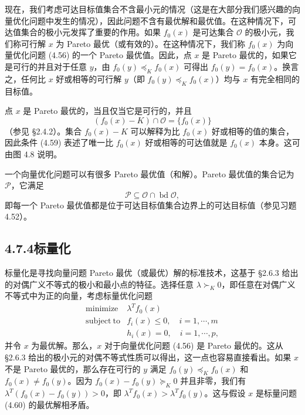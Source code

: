 \documentclass[UTF8, 12pt, fontset=fandol, oneside]{ctexart}
\begin{document}
现在，我们考虑可达目标值集合不含最小元的情况（这是在大部分我们感兴趣的向量优化问题中发生的情况），因此问题不含有最优解和最优值。在这种情况下，可达值集合的极小元发挥了重要的作用。如果 $f_0(x)$ 是可达集合 $\mathcal{O}$ 的极小元，我们称可行解 $x$ 为 Pareto 最优（或有效的）。在这种情况下，我们称 $f_0(x)$ 为向量优化问题 (4.56) 的一个 Pareto 最优值。因此，点 $x$ 是 Pareto 最优的，如果它是可行的并且对于任意 $y$，由 $f_0(y)\preceq_K f_0(x)$ 可得出 $f_0(y)=f_0(x)$。换言之，任何比 $x$ 好或相等的可行解 $y$（即 $f_0(y)\preceq_K f_0(x)$）均与 $x$ 有完全相同的目标值。

点 $x$ 是 Pareto 最优的，当且仅当它是可行的，并且
\begin{equation}
(f_0(x)-K)\cap\mathcal{O}=\{f_0(x)\}
\tag{4.59}
\end{equation}
（参见 \S 2.4.2）。集合 $f_0(x)-K$ 可以解释为比 $f_0(x)$ 好或相等的值的集合，因此条件 (4.59) 表述了唯一比 $f_0(x)$ 好或相等的可达值就是 $f_0(x)$ 本身。这可由图 4.8 说明。

一个向量优化问题可以有很多 Pareto 最优值（和解）。Pareto 最优值的集合记为 $\mathcal{P}$，它满足
\[
\mathcal{P}\subseteq \mathcal{O}\cap\operatorname{bd}\mathcal{O},
\]
即每一个 Pareto 最优值都是位于可达目标值集合边界上的可达目标值（参见习题 4.52）。

\subsection*{4.7.4\quad 标量化}

标量化是寻找向量问题 Pareto 最优（或最优）解的标准技术，这基于 \S 2.6.3 给出的对偶广义不等式的极小和最小点的特征。选择任意 $\lambda\succ_K 0$，即任意在对偶广义不等式中为正的向量，考虑标量优化问题
\begin{equation}
\begin{array}{ll}
\mathop{\mathrm{minimize}} & \lambda^Tf_0(x)\\
\mathrm{subject\ to} & f_i(x)\leq 0,\quad i=1,\cdots,m\\
& h_i(x)=0,\quad i=1,\cdots,p,
\end{array}
\tag{4.60}
\end{equation}
并令 $x$ 为最优解。那么，$x$ 对于向量优化问题 (4.56) 是 Pareto 最优的。这从 \S 2.6.3 给出的极小元的对偶不等式性质可以得出，这一点也容易直接看出。如果 $x$ 不是 Pareto 最优的，那么存在可行的 $y$ 满足 $f_0(y)\preceq_K f_0(x)$ 和 $f_0(x)\neq f_0(y)$。因为 $f_0(x)-f_0(y)\succeq_K 0$ 并且非零，我们有 $\lambda^T(f_0(x)-f_0(y))>0$，即 $\lambda^Tf_0(x)>\lambda^Tf_0(y)$。这与假设 $x$ 是标量问题 (4.60) 的最优解相矛盾。
\end{document}
